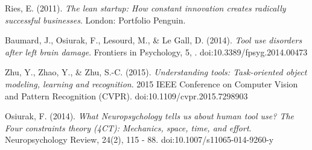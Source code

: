 \documentclass[11]{article}
\begin{document}
\begin{thebibliography}{9}
Ries, E. (2011). \emph{The lean startup: How constant innovation creates radically successful businesses}. London: Portfolio Penguin.

Baumard, J., Osiurak, F., Lesourd, M., \& Le Gall, D. (2014). \emph{Tool use disorders after left brain damage}. Frontiers in Psychology, 5, . doi:10.3389/fpsyg.2014.00473

Zhu, Y., Zhao, Y., \& Zhu, S.-C. (2015). \emph{Understanding tools: Task-oriented object modeling, learning and recognition}. 2015 IEEE Conference on Computer Vision and Pattern Recognition (CVPR). doi:10.1109/cvpr.2015.7298903

Osiurak, F. (2014). \emph{What Neuropsychology tells us about human tool use? The Four constraints theory (4CT): Mechanics, space, time, and effort}. Neuropsychology Review, 24(2), 115 - 88. doi:10.1007/s11065-014-9260-y


\end{thebibliography}
\end{document}
